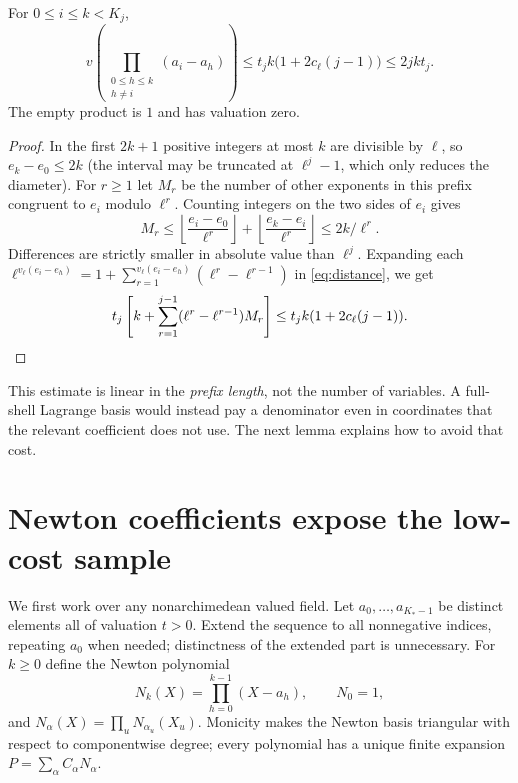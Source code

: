 \documentclass[11pt]{article}
\begin{document}
\begin{lemma}\label{lem:prefix}
For $0\le i\le k<K_j$,
\[
 v\left(\prod_{\substack{0\le h\le k\\h\ne i}}(a_i-a_h)\right)
 \le t_j k\bigl(1+2c_\ell(j-1)\bigr)\le 2jkt_j.
\]
The empty product is $1$ and has valuation zero.
\end{lemma}
\begin{proof}
In the first $2k+1$ positive integers at most $k$ are divisible by $\ell$, so $e_k-e_0\le2k$ (the interval may be truncated at $\ell^j-1$, which only reduces the diameter). For $r\ge1$ let $M_r$ be the number of other exponents in this prefix congruent to $e_i$ modulo $\ell^r$. Counting integers on the two sides of $e_i$ gives
\[
 M_r\le \left\lfloor\frac{e_i-e_0}{\ell^r}\right\rfloor+
 \left\lfloor\frac{e_k-e_i}{\ell^r}\right\rfloor\le2k/\ell^r.
\]
Differences are strictly smaller in absolute value than $\ell^j$. Expanding each $\ell^{v_\ell(e_i-e_h)}=1+\sum_{r=1}^{v_\ell(e_i-e_h)}(\ell^r-\ell^{r-1})$ in \eqref{eq:distance}, we get
\[
 t_j\left[k+\sum_{r=1}^{j-1}(\ell^r-\ell^{r-1})M_r\right]
 \le t_j k(1+2c_\ell(j-1)).\qedhere
\]
\end{proof}
This estimate is linear in the \emph{prefix length}, not the number of variables. A full-shell Lagrange basis would instead pay a denominator even in coordinates that the relevant coefficient does not use. The next lemma explains how to avoid that cost.

\section{Newton coefficients expose the low-cost sample}\label{sec:newton}
We first work over any nonarchimedean valued field. Let $a_0,\ldots,a_{K_*-1}$ be distinct elements all of valuation $t>0$. Extend the sequence to all nonnegative indices, repeating $a_0$ when needed; distinctness of the extended part is unnecessary. For $k\ge0$ define the Newton polynomial
\[
 N_k(X)=\prod_{h=0}^{k-1}(X-a_h),\qquad N_0=1,
\]
and $N_\alpha(X)=\prod_u N_{\alpha_u}(X_u)$. Monicity makes the Newton basis triangular with respect to componentwise degree; every polynomial has a unique finite expansion $P=\sum_\alpha C_\alpha N_\alpha$.
\end{document}
